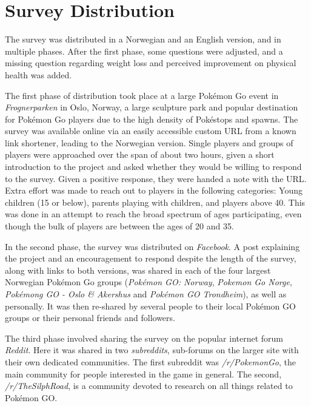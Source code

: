 \section{Survey Distribution}

The survey was distributed in a Norwegian and an English version, and in multiple phases. After the first phase, some questions were adjusted, and a missing question regarding weight loss and perceived improvement on physical health was added.

The first phase of distribution took place at a large Pokémon Go event in \emph{Frognerparken} in Oslo, Norway, a large sculpture park and popular destination for Pokémon Go players due to the high density of Pokéstops and spawns. The survey was available online via an easily accessible custom URL from a known link shortener, leading to the Norwegian version. Single players and groups of players were approached over the span of about two hours, given a short introduction to the project and asked whether they would be willing to respond to the survey. Given a positive response, they were handed a note with the URL. Extra effort was made to reach out to players in the following categories: Young children (15 or below), parents playing with children, and players above 40. This was done in an attempt to reach the broad spectrum of ages participating, even though the bulk of players are between the ages of 20 and 35. 

In the second phase, the survey was distributed on \emph{Facebook}. A post explaining the project and an encouragement to respond despite the length of the survey, along with links to both versions, was shared in each of the four largest Norwegian Pokémon Go groups (\emph{Pokémon GO: Norway}, \emph{Pokemon Go Norge}, \emph{Pokémong GO - Oslo \& Akershus} and \emph{Pokémon GO Trondheim}), as well as personally. It was then re-shared by several people to their local Pokémon GO groups or their personal friends and followers. 

The third phase involved sharing the survey on the popular internet forum \emph{Reddit}. Here it was shared in two \emph{subreddits}, sub-forums on the larger site with their own dedicated communities. The first subreddit was \emph{/r/PokemonGo}, the main community for people interested in the game in general. The second, \emph{/r/TheSilphRoad}, is a community devoted to research on all things related to Pokémon GO.

